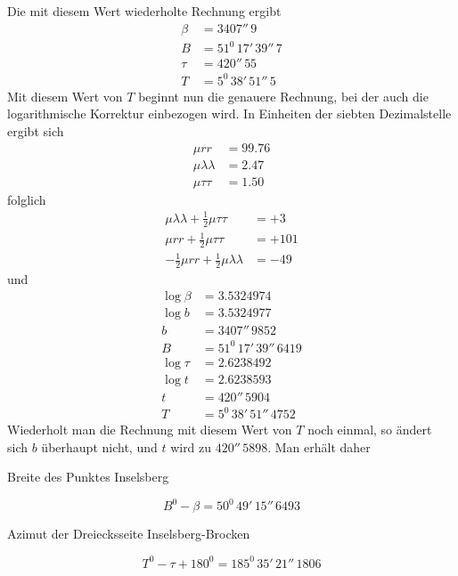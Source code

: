 %
Die mit diesem Wert wiederholte Rechnung ergibt
\[
\begin{aligned}
\beta&=3407''\,9\\
B&=51^0\,17'\,39''\,7\\
\tau&=420''\,55\\
T&=5^0\,38'\,51''\,5
\end{aligned}
\]
Mit diesem Wert von \(T\) beginnt nun die genauere Rechnung, bei der auch die logarithmische Korrektur einbezogen wird. In Einheiten der siebten Dezimalstelle ergibt sich
\[
\begin{aligned}
\mu rr&=99.76\\
\mu\lambda\lambda&=2.47\\
\mu\tau\tau&=1.50
\end{aligned}
\]
folglich
\[
\begin{aligned}
\mu\lambda\lambda+\tfrac12\mu\tau\tau&=+3\\
\mu rr+\tfrac12\mu\tau\tau&=+101\\
-\tfrac12\mu rr+\tfrac12\mu\lambda\lambda&=-49
\end{aligned}
\]
und
\[
\begin{aligned}
\log\beta&=3.5324974\\
\log b&=3.5324977\\
b&=3407''\,9852\\
B&=51^0\,17'\,39''\,6419\\
\log\tau&=2.6238492\\
\log t&=2.6238593\\
t&=420''\,5904\\
T&=5^0\,38'\,51''\,4752
\end{aligned}
\]
Wiederholt man die Rechnung mit diesem Wert von \(T\) noch einmal, so ändert sich \(b\) überhaupt nicht, und \(t\) wird zu \(420''\,5898\). Man erhält daher
\begin{center}Breite des Punktes Inselsberg\end{center}
\[
B^0-\beta=50^0\,49'\,15''\,6493
\]
\begin{center}Azimut der Dreiecksseite Inselsberg-Brocken\end{center}
\[
T^0-\tau+180^0=185^0\,35'\,21''\,1806
\]
